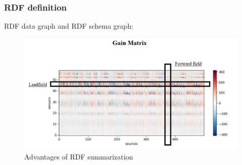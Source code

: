 \documentclass{beamer}
\numberwithin{figure}{section}
\numberwithin{equation}{section}
\begin{document}
\section{}
\begin{frame}
 \frametitle{RDF definition}
 	RDF data graph and RDF schema graph:
 	
 	\begin{figure}[p]
  		\centering
  		\includegraphics[width=1.0\linewidth]{pictures/lf}
  		\caption{\scriptsize Advantages of RDF summarization}
  		\label{fig:approaches_RDF}
 	\end{figure}
    
\end{frame}


\end{document}

